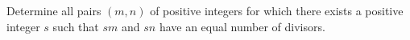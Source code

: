 Determine all pairs $(m, n)$ of positive integers for which there exists a positive integer $s$ such that $sm$ and $sn$ have an equal number of divisors.